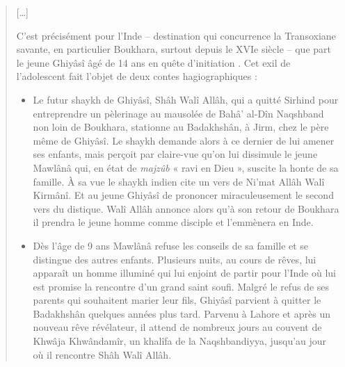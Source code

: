 \begin{quote}
\begin{figure}[h!]
\end{figure}

{[}\ldots{]}

C'est précisément pour l'Inde -- destination qui concurrence la
Transoxiane savante, en particulier Boukhara, surtout depuis le XVIe
siècle -- que part le jeune Ghiyâsî âgé de 14 ans en quête d'initiation .
Cet exil de l'adolescent fait l'objet de deux contes hagiographiques :
 

\begin{itemize}
\item
 
  Le futur shaykh de Ghiyâsî, Shâh Walî Allâh, qui a quitté Sirhind pour
  entreprendre un pèlerinage au mausolée de Bahâ' al-Dîn Naqshband non
  loin de Boukhara, stationne au Badakhshân, à Jirm, chez le père même
  de Ghiyâsî. Le shaykh demande alors à ce dernier de lui amener ses
  enfants, mais perçoit par claire-vue qu'on lui dissimule le jeune
  Mawlânâ qui, en état de \emph{majzûb} « ravi en Dieu », suscite la honte de
  sa famille. À sa vue le shaykh indien cite un vers de Ni'mat Allâh
  Walî Kirmânî. Et au jeune Ghiyâsî de prononcer miraculeusement le
  second vers du distique. Walî Allâh annonce alors qu'à son retour de
  Boukhara il prendra le jeune homme comme disciple et l'emmènera en
  Inde.
  
\item
 
  Dès l'âge de 9 ans Mawlânâ refuse les conseils de sa famille et se
  distingue des autres enfants. Plusieurs nuits, au cours de rêves, lui
  apparaît un homme illuminé qui lui enjoint de partir pour l'Inde où
  lui est promise la rencontre d'un grand saint soufi. Malgré le refus
  de ses parents qui souhaitent marier leur fils, Ghiyâsî parvient à
  quitter le Badakhshân quelques années plus tard. Parvenu à Lahore et
  après un nouveau rêve révélateur, il attend de nombreux jours au
  couvent de Khwâja Khwândamîr, un khalîfa de la Naqshbandiyya, jusqu'au
  jour où il rencontre Shâh Walî Allâh.
 
\end{itemize}


\end{quote}
